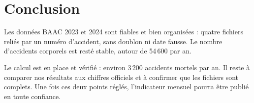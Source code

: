 \documentclass[11pt,a4paper]{article}
\begin{document}
\section{Conclusion}

Les données BAAC 2023 et 2024 sont fiables et bien organisées : quatre fichiers
reliés par un numéro d'accident, sans doublon ni date fausse. Le nombre
d'accidents corporels est resté stable, autour de 54\,600 par an.

Le calcul est en place et vérifié : environ 3\,200 accidents mortels par an.
Il reste à comparer nos résultats aux chiffres officiels et à confirmer que
les fichiers sont complets. Une fois ces deux points réglés, l'indicateur
mensuel pourra être publié en toute confiance.
\end{document}
